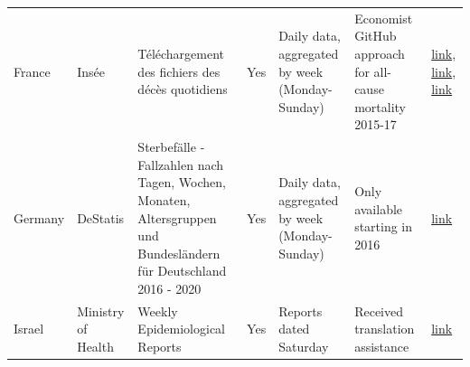 \documentclass[
]{article}
\begin{document}
\begin{landscape}
\begin{table}[]
\begin{tabular}{p{.5in}p{1.5in}p{2in}p{1in}p{1.5in}p{1in}p{.5in}}
France           & Insée                                                                                                                                                                & Téléchargement des fichiers des décès quotidiens                                                                                                                           & Yes               & Daily data, aggregated by week (Monday-Sunday) & Economist GitHub approach for all-cause mortality 2015-17                    & \href{https://www.insee.fr/fr/statistiques/4487988?sommaire=4487854}{link},
\href{https://www.insee.fr/fr/information/4190491}{link}, \href{https://github.com/TheEconomist/covid-19-excess-deaths-tracker}{link}                                                                                                                                                               \\
Germany          & DeStatis                                                                                                                                                             & Sterbefälle - Fallzahlen nach Tagen, Wochen, Monaten,   Altersgruppen und Bundesländern für Deutschland 2016 - 2020                                                        & Yes               & Daily data, aggregated by week (Monday-Sunday) & Only available starting in 2016                                          & \href{https://www.destatis.de/DE/Themen/Gesellschaft-Umwelt/Bevoelkerung/Sterbefaelle-Lebenserwartung/Tabellen/sonderauswertung-sterbefaelle.html}{link}                                                                                                                                                                                   \\
Israel           & Ministry of Health                                                                                                                                                   & Weekly Epidemiological Reports                                                                                                                                      & Yes               & Reports dated Saturday                                          & Received translation assistance                                          & \href{https://www.health.gov.il/UnitsOffice/HD/PH/epidemiology/Pages/epidemiology\_report.aspx?WPID=WPQ7\&PN=7\&fbclid=IwAR2sz9mHp4lpB8rXm0gdvIoiftfnmmHqSwra8IWl7voMw1mmpffzWrRG774}{link}                                                                                                                                                \\

\end{tabular}
\end{table}
\end{landscape}
\end{document}
